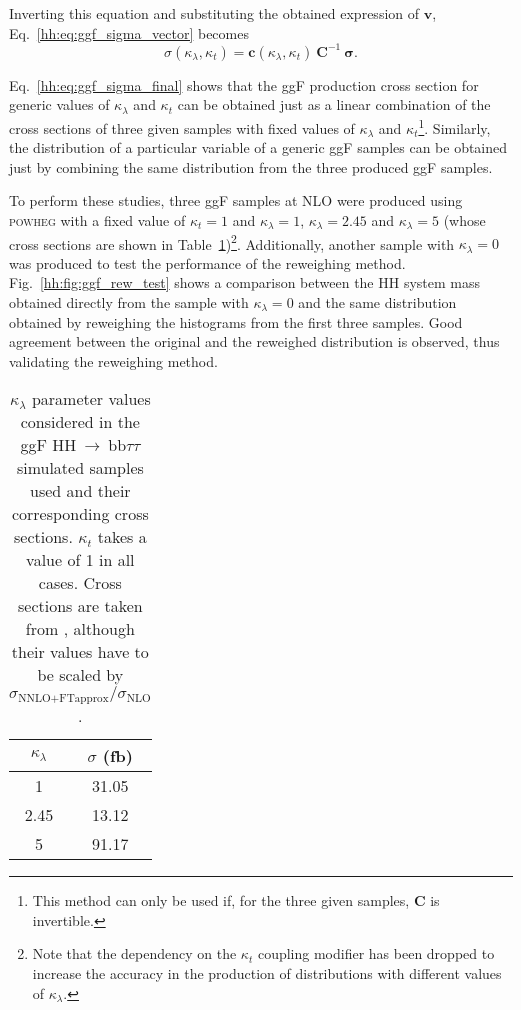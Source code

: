\documentclass[../main.tex]{subfiles}
\begin{document}
Inverting this equation and substituting the obtained expression of $\mathbf{v}$, Eq.~\eqref{hh:eq:ggf_sigma_vector} becomes
\begin{equation}
\label{hh:eq:ggf_sigma_final}
\sigma(\kappa_\lambda, \kappa_t) = \mathbf{c}(\kappa_\lambda, \kappa_t)~\mathbf{C}^{-1}~\boldsymbol{\sigma}.
\end{equation}

Eq.~\eqref{hh:eq:ggf_sigma_final} shows that the ggF production cross section for generic values of $\kappa_\lambda$ and $\kappa_t$ can be obtained just as a linear combination of the cross sections of three given samples with fixed values of  $\kappa_\lambda$ and $\kappa_t$\footnote{This method can only be used if, for the three given samples, $\mathbf{C}$ is invertible.}. Similarly, the distribution of a particular variable of a generic ggF samples can be obtained just by combining the same distribution from the three produced ggF samples.

To perform these studies, three ggF samples at NLO were produced using \textsc{powheg} with a fixed value of $\kappa_t=1$ and $\kappa_\lambda=1$, $\kappa_\lambda=2.45$ and $\kappa_\lambda=5$ (whose cross sections are shown in Table~\ref{hh:analysis:ggf_samples})\footnote{Note that the dependency on the $\kappa_t$ coupling modifier has been dropped to increase the accuracy in the production of distributions with different values of $\kappa_\lambda$.}. Additionally, another sample with $\kappa_\lambda=0$ was produced to test the performance of the reweighing method. Fig.~\ref{hh:fig:ggf_rew_test} shows a comparison between the HH system mass obtained directly from the sample with $\kappa_\lambda=0$ and the same distribution obtained by reweighing the histograms from the first three samples. Good agreement between the original and the reweighed distribution is observed, thus validating the reweighing method. 

\begin{table}[h!]
\begin{center}
\begin{tabular}{c | c}
$\kappa_\lambda$ & $\sigma$ (fb) \\ \hline
1    & 31.05 \\
2.45 & 13.12 \\
5    & 91.17
\end{tabular}
\caption[$\kappa_\lambda$ parameter values in the HH ggF samples]{$\kappa_\lambda$ parameter values considered in the ggF HH$~\to~$bb$\tau\tau$ simulated samples used and their corresponding cross sections. $\kappa_t$ takes a value of 1 in all cases. Cross sections are taken from \cite{hh:analysis:xs}, although their values have to be scaled by $\sigma_{\text{NNLO+FTapprox}}/\sigma_\text{NLO}$.}
\label{hh:analysis:ggf_samples}
\end{center}
\end{table}
\end{document}
